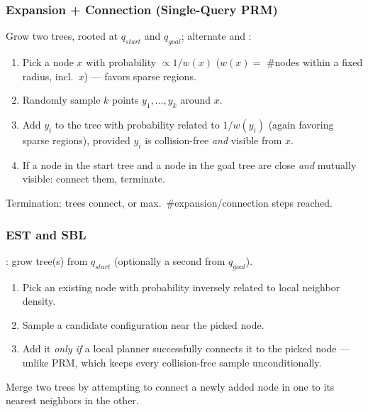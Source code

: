 \subsubsection{Expansion + Connection (Single-Query PRM)}
Grow two trees, rooted at $q_{start}$ and $q_{goal}$; alternate  and :
\begin{enumerate}
\item Pick a node $x$ with probability $\propto 1/w(x)$ ($w(x)=$ \#nodes within a fixed radius, incl.\ $x$) — favors sparse regions.
\item Randomly sample $k$ points $y_1,\dots,y_k$ around $x$.
\item Add $y_i$ to the tree with probability related to $1/w(y_i)$ (again favoring sparse regions), provided $y_i$ is collision-free \emph{and} visible from $x$.
\item If a node in the start tree and a node in the goal tree are close \emph{and} mutually visible: connect them, terminate.
\end{enumerate}
Termination: trees connect, or max.\ \#expansion/connection steps reached.


\subsubsection{EST and SBL}
: grow tree(s) from $q_{start}$ (optionally a second from $q_{goal}$).
\begin{enumerate}
\item Pick an existing node with probability inversely related to local neighbor density.
\item Sample a candidate configuration near the picked node.
\item Add it \emph{only if} a local planner successfully connects it to the picked node — unlike PRM, which keeps every collision-free sample unconditionally.
\end{enumerate}
Merge two trees by attempting to connect a newly added node in one to its nearest neighbors in the other.


